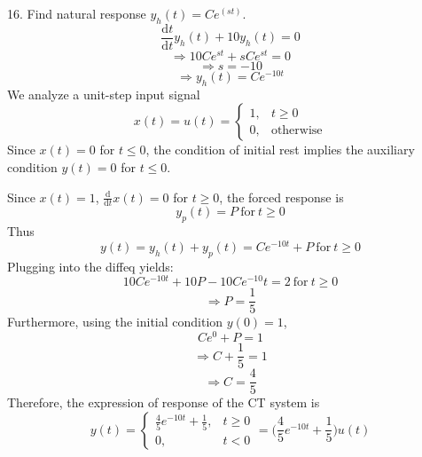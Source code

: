 \documentclass[a4paper]{article}
\begin{document}
16. Find natural response $y_h(t)=Ce^(st)$.
$$\frac{\mathrm{d}t}{\mathrm{d}t}y_h(t)+10y_h(t)=0$$
$$\Longrightarrow10Ce^{st}+sCe^{st}=0$$
$$\Longrightarrow s=-10$$
$$\Longrightarrow y_h(t)=Ce^{-10t}$$
We analyze a unit-step input signal
\[x(t)=u(t)=
    \begin{cases}
        1,&t\geq0\\
        0,&\text{otherwise}
    \end{cases}
\]
Since $x(t)=0$ for $t\leq0$, the condition of initial rest implies the auxiliary condition $y(t)=0$ for $t\leq0$.

Since $x(t)=1$, $\frac{\mathrm{d}}{\mathrm{d}t}x(t)=0$ for $t\geq0$, the forced response is
$$y_p(t)=P\ \text{for}\ t\geq0$$
Thus
$$y(t)=y_h(t)+y_p(t)=Ce^{-10t}+P\ \text{for}\ t\geq0$$
Plugging into the diffeq yields:
$$10Ce^{-10t}+10P-10Ce^{-10}t=2\ \text{for}\ t\geq0$$
$$\Longrightarrow P=\frac{1}{5}$$
Furthermore, using the initial condition $y(0)=1$,
$$Ce^0+P=1$$
$$\Longrightarrow C+\frac{1}{5}=1$$
$$\Longrightarrow C=\frac{4}{5}$$
Therefore, the expression of response of the CT system is
\[\boxed{y(t)=
    \begin{cases}
        \frac{4}{5}e^{-10t}+\frac{1}{5},&t\geq0\\
        0,&t<0
    \end{cases}
    =\bigg(\frac{4}{5}e^{-10t}+\frac{1}{5}\bigg)u(t)}
\]
\end{document}
